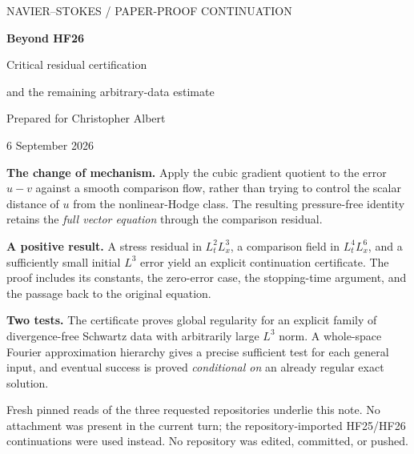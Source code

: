 \documentclass[11pt,a4paper]{article}
\theoremstyle{definition}\newtheorem{definition}[theorem]{Definition}
\theoremstyle{remark}\newtheorem{remark}[theorem]{Remark}
\numberwithin{equation}{section}
\begin{document}
\hypersetup{pageanchor=false}
\begin{titlepage}\thispagestyle{empty}
\vspace*{8mm}
{\sffamily\small\color{blue!45!black} NAVIER--STOKES / PAPER-PROOF CONTINUATION\par}
\vspace{9mm}
{\LARGE\bfseries Beyond HF26\par}
\vspace{5mm}
{\Large Critical residual certification\par and the remaining arbitrary-data estimate\par}
\vspace{9mm}
Prepared for Christopher Albert\par
6 September 2026\par
\vspace{8mm}
\noindent\textbf{The change of mechanism.} Apply the cubic gradient quotient to the error $u-v$ against a smooth comparison flow, rather than trying to control the scalar distance of $u$ from the nonlinear-Hodge class. The resulting pressure-free identity retains the \emph{full vector equation} through the comparison residual.

\noindent\textbf{A positive result.} A stress residual in $L^2_tL^3_x$, a comparison field in $L^4_tL^6_x$, and a sufficiently small initial $L^3$ error yield an explicit continuation certificate. The proof includes its constants, the zero-error case, the stopping-time argument, and the passage back to the original equation.

\noindent\textbf{Two tests.} The certificate proves global regularity for an explicit family of divergence-free Schwartz data with arbitrarily large $L^3$ norm. A whole-space Fourier approximation hierarchy gives a precise sufficient test for each general input, and eventual success is proved \emph{conditional on} an already regular exact solution.\par
\vspace{5mm}
\noindent{}\par
\vfill
{\small Fresh pinned reads of the three requested repositories underlie this note. No attachment was present in the current turn; the repository-imported HF25/HF26 continuations were used instead. No repository was edited, committed, or pushed.}
\end{titlepage}
\hypersetup{pageanchor=true}
{\small\setlength{\parskip}{0pt}\tableofcontents}
\newpage
\end{document}
